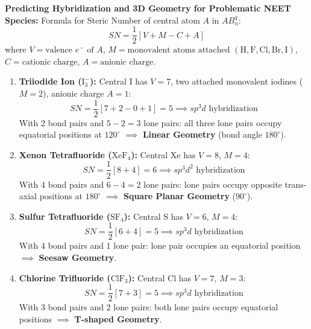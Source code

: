 \documentclass[10pt,a4paper]{article}
\begin{document}
\begin{usecasebox}
\textbf{Predicting Hybridization and 3D Geometry for Problematic NEET Species:}
Formula for Steric Number of central atom $A$ in $AB_n^{q}$:
\begin{equation*}
  SN = \frac{1}{2}\left[V + M - C + A\right]
\end{equation*}
where $V = \text{valence } e^- \text{ of } A$, $M = \text{monovalent atoms attached } (\mathrm{H, F, Cl, Br, I})$, $C = \text{cationic charge}$, $A = \text{anionic charge}$.
\begin{enumerate}
  \item \textbf{Triiodide Ion ($\mathrm{I_3^-}$):} Central $\mathrm{I}$ has $V = 7$, two attached monovalent iodines ($M = 2$), anionic charge $A = 1$:
  \begin{equation*}
    SN = \frac{1}{2}[7 + 2 - 0 + 1] = 5 \implies sp^3d \text{ hybridization}
  \end{equation*}
  With 2 bond pairs and $5 - 2 = 3$ lone pairs: all three lone pairs occupy equatorial positions at $120^\circ$ $\implies$ \textbf{Linear Geometry} (bond angle $180^\circ$).
  \item \textbf{Xenon Tetrafluoride ($\mathrm{XeF_4}$):} Central $\mathrm{Xe}$ has $V = 8$, $M = 4$:
  \begin{equation*}
    SN = \frac{1}{2}[8 + 4] = 6 \implies sp^3d^2 \text{ hybridization}
  \end{equation*}
  With 4 bond pairs and $6 - 4 = 2$ lone pairs: lone pairs occupy opposite trans-axial positions at $180^\circ$ $\implies$ \textbf{Square Planar Geometry} ($90^\circ$).
  \item \textbf{Sulfur Tetrafluoride ($\mathrm{SF_4}$):} Central $\mathrm{S}$ has $V = 6$, $M = 4$:
  \begin{equation*}
    SN = \frac{1}{2}[6 + 4] = 5 \implies sp^3d \text{ hybridization}
  \end{equation*}
  With 4 bond pairs and 1 lone pair: lone pair occupies an equatorial position $\implies$ \textbf{Seesaw Geometry}.
  \item \textbf{Chlorine Trifluoride ($\mathrm{ClF_3}$):} Central $\mathrm{Cl}$ has $V = 7$, $M = 3$:
  \begin{equation*}
    SN = \frac{1}{2}[7 + 3] = 5 \implies sp^3d \text{ hybridization}
  \end{equation*}
  With 3 bond pairs and 2 lone pairs: both lone pairs occupy equatorial positions $\implies$ \textbf{T-shaped Geometry}.
\end{enumerate}
\end{usecasebox}
\end{document}
